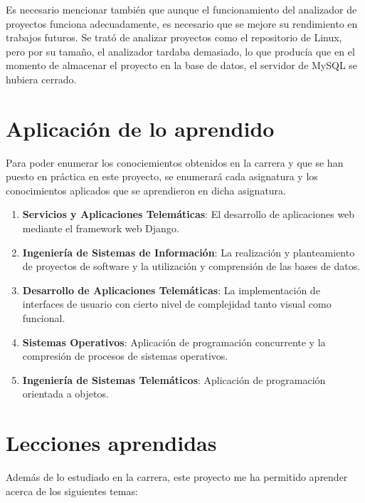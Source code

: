 \documentclass[a4paper, spanish, 12pt]{book}
\begin{document}
Es necesario mencionar tambi\'en que aunque el funcionamiento del analizador de
proyectos funciona adecuadamente, es necesario que se mejore su rendimiento en
trabajos futuros. Se trat\'o de analizar proyectos como el repositorio de Linux,
pero por su tama\~no, el analizador tardaba demasiado, lo que produc\'ia que en el
momento de almacenar el proyecto en la base de datos, el servidor de MySQL se hubiera
cerrado.

\section{Aplicaci\'on de lo aprendido}
\label{sec:aplicacion}

Para poder enumerar los conociemientos obtenidos en la carrera y que se han puesto
en pr\'actica en este proyecto, se enumerar\'a cada asignatura y los conocimientos
aplicados que se aprendieron en dicha asignatura.

\begin{enumerate}
  \item \textbf{Servicios y Aplicaciones Telem\'aticas}: El desarrollo de aplicaciones
  web mediante el framework web Django.

  \item \textbf{Ingenier\'ia de Sistemas de Informaci\'on}: La realizaci\'on y planteamiento
  de proyectos de software y la utilizaci\'on y comprensi\'on de las bases de datos.

  \item \textbf{Desarrollo de Aplicaciones Telem\'aticas}: La implementaci\'on de
  interfaces de usuario con cierto nivel de complejidad tanto visual como funcional.

  \item \textbf{Sistemas Operativos}: Aplicaci\'on de programaci\'on concurrente
  y la compresi\'on de procesos de sistemas operativos.

  \item \textbf{Ingenier\'ia de Sistemas Telem\'aticos}: Aplicaci\'on de programaci\'on
  orientada a objetos.
\end{enumerate}

\section{Lecciones aprendidas}
\label{sec:lecciones_aprendidas}

Adem\'as de lo estudiado en la carrera, este proyecto me ha permitido aprender
acerca de los siguientes temas:
\end{document}

